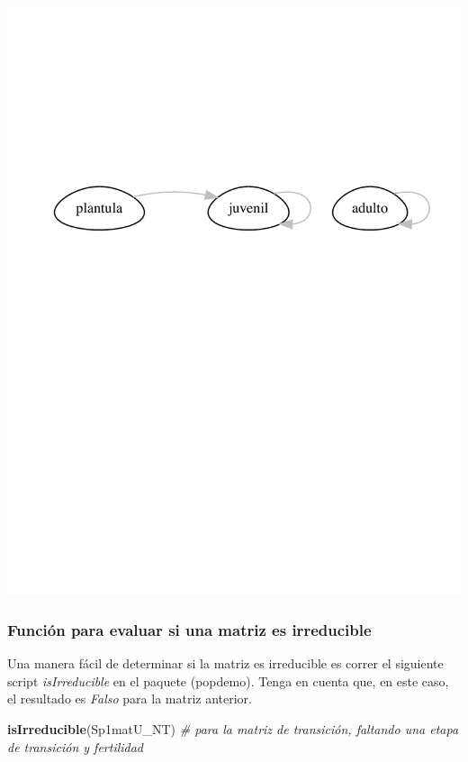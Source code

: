 \documentclass[
]{book}
\newenvironment{Shaded}{\begin{snugshade}}{\end{snugshade}}
\newcommand{\CommentTok}[1]{\textcolor[rgb]{0.56,0.35,0.01}{\textit{#1}}}
\newcommand{\FunctionTok}[1]{\textcolor[rgb]{0.13,0.29,0.53}{\textbf{#1}}}
\newcommand{\NormalTok}[1]{#1}
\theoremstyle{definition}
\theoremstyle{definition}
\theoremstyle{definition}
\theoremstyle{definition}
\theoremstyle{remark}
\begin{document}
\includegraphics{Diagnostico_Poblacional_files/figure-latex/unnamed-chunk-41-1.pdf}

\subsubsection{Función para evaluar si una matriz es irreducible}\label{funciuxf3n-para-evaluar-si-una-matriz-es-irreducible}

Una manera fácil de determinar si la matriz es irreducible es correr el siguiente script \emph{isIrreducible} en el paquete (popdemo). Tenga en cuenta que, en este caso, el resultado es \emph{Falso} para la matriz anterior.

\begin{Shaded}
\begin{Highlighting}[]
\FunctionTok{isIrreducible}\NormalTok{(Sp1matU\_NT) }\CommentTok{\# para la matriz de transición, faltando una etapa de transición y fertilidad}
\end{Highlighting}
\end{Shaded}
\end{document}
